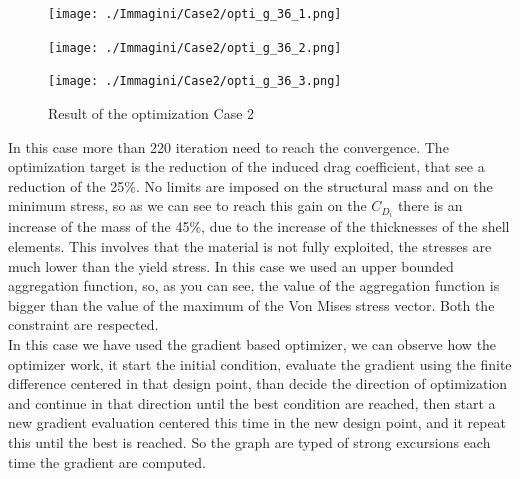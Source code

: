 \begin{figure}[H]
	\centering
	\texttt{[image: ./Immagini/Case2/opti\_g\_36\_1.png]}
\end{figure}
\begin{figure}[H]
	\centering
	\texttt{[image: ./Immagini/Case2/opti\_g\_36\_2.png]}
\end{figure}
\begin{figure}[H]
	\centering
	\texttt{[image: ./Immagini/Case2/opti\_g\_36\_3.png]}
	\caption{Result of the optimization Case 2}
	\label{fig:6_3}
\end{figure}
In this case more than 220 iteration need to reach the convergence. The optimization target is the reduction of the induced drag coefficient, that see a reduction of the 25\%. No limits are imposed on the structural mass and on the minimum stress, so as we can see to reach this gain on the $C_{D_i}$ there is an increase of the mass of the 45\%, due to the increase of the thicknesses of the shell elements. This involves that the material is not fully exploited, the stresses are much lower than the yield stress. In this case we used an upper bounded aggregation function, so, as you can see, the value of the aggregation function is bigger than the value of the maximum of the Von Mises stress vector. Both the constraint are respected.\\
In this case we have used the gradient based optimizer, we can observe how the optimizer work, it start the initial condition, evaluate the gradient using the finite difference centered in that design point, than decide the direction of optimization and continue in that direction until the best condition are reached, then start a new gradient evaluation centered this time in the new design point, and it repeat this until the best is reached. So the graph are typed of strong excursions each time the gradient are computed. 
